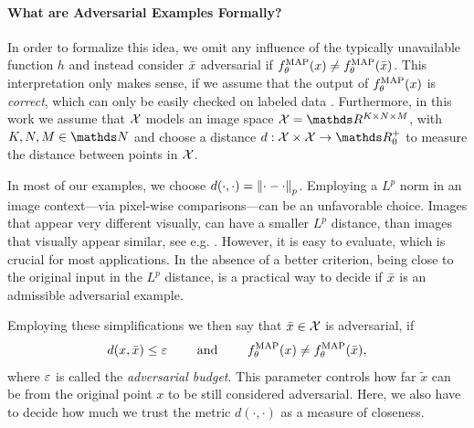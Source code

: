 \paragraph{What are Adversarial Examples Formally?} In order to formalize this idea, we omit any influence of the typically unavailable function $h$ and instead consider $\bar{x}$ adversarial if $f_\theta^{\operatorname{MAP}}(x)\neq f^{\operatorname{MAP}}_\theta(\bar{x})$. This interpretation only makes sense, if we assume that the output of  $f^{\operatorname{MAP}}_\theta(x)$ is \emph{correct}, which can only be easily checked on labeled data \cite{bungert2023begins}. Furthermore, in this work we assume that $\mathcal{X}$ models an image space $\Inp=\R^{K\times N\times M}$, with $K,N,M\in\N$ and choose a distance $d:\Inp\times\Inp\to\R^+_0$ to measure the distance between points in $\mathcal{X}$. 
%
\begin{remark}{}{}
In most of our examples, we choose $d(\cdot,\cdot) = \left\|\cdot - \cdot\right\|_p$. Employing a $L^p$ norm in an image context---via pixel-wise comparisons---can be an unfavorable choice. Images that appear very different visually, can have a smaller $L^p$ distance, than images that visually appear similar, see e.g. \cite[Fig. 16]{stanczuk2021wasserstein}. However, it is easy to evaluate, which is crucial for most applications. In the absence of a better criterion, being close to the original input in the $L^p$ distance, is a practical way to decide if $\bar{x}$ is an admissible adversarial example. 
\end{remark}
%
%
\noindent%
Employing these simplifications we then say that $\bar{x}\in\mathcal{X}$ is adversarial, if
%
\begin{align*}
d(x,\bar{x}) \leq \varepsilon \qquad \text{ and } \qquad f_\theta^{\operatorname{MAP}}(x)\neq f_\theta^{\operatorname{MAP}}(\bar{x}),
\end{align*}
%
where $\varepsilon$ is called the \emph{adversarial budget}. This parameter controls how far $\tilde{x}$ can be from the original point $x$ to be still considered adversarial. Here, we also have to decide how much we trust the metric $d(\cdot,\cdot)$ as a measure of closeness.
%
%
